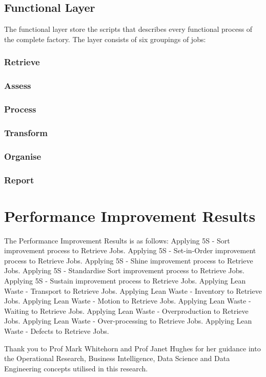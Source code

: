 \documentclass{sigplanconf}
\begin{document}
\subsection{Functional Layer}
The functional layer store the scripts that describes every functional process of the complete factory. The layer consists of six groupings of jobs:
\subsubsection{Retrieve}

\subsubsection{Assess}

\subsubsection{Process}

\subsubsection{Transform}

\subsubsection{Organise}

\subsubsection{Report}

\appendix
\section{Performance Improvement Results}
The Performance Improvement Results is as follows:
Applying 5S - Sort improvement process to Retrieve Jobs.
Applying 5S - Set-in-Order improvement process to Retrieve Jobs.
Applying 5S - Shine improvement process to Retrieve Jobs.
Applying 5S - Standardise Sort improvement process to Retrieve Jobs.
Applying 5S - Sustain improvement process to Retrieve Jobs.
Applying Lean Waste - Transport to Retrieve Jobs.
Applying Lean Waste - Inventory to Retrieve Jobs.
Applying Lean Waste - Motion to Retrieve Jobs.
Applying Lean Waste - Waiting to Retrieve Jobs.
Applying Lean Waste - Overproduction to Retrieve Jobs.
Applying Lean Waste - Over-processing to Retrieve Jobs.
Applying Lean Waste - Defects to Retrieve Jobs.

\acks

Thank you to Prof Mark Whitehorn and Prof Janet Hughes for her guidance into the Operational Research, Business Intelligence, Data Science and Data Engineering concepts utilised in this research.






\softraggedright
\end{document}
